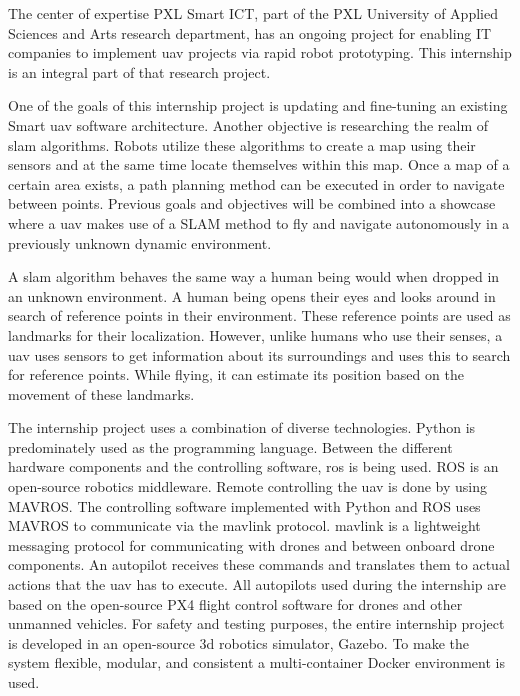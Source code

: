 The center of expertise PXL Smart ICT, part of the PXL University of Applied Sciences and Arts research department, has an ongoing project for enabling IT companies to implement \ac{uav} projects via rapid robot prototyping. This internship is an integral part of that research project.

One of the goals of this internship project is updating and fine\hyp{}tuning an existing Smart \acs{uav} software architecture. Another objective is researching the realm of \ac{slam} algorithms. Robots utilize these algorithms to create a map using their sensors and at the same time locate themselves within this map. Once a map of a certain area exists, a path planning method can be executed in order to navigate between points. Previous goals and objectives will be combined into a showcase where a \acs{uav} makes use of a SLAM method to fly and navigate autonomously in a previously unknown dynamic environment.

A \acs{slam} algorithm behaves the same way a human being would when dropped in an unknown environment. A human being opens their eyes and looks around in search of reference points in their environment. These reference points are used as landmarks for their localization. However, unlike humans who use their senses, a \acs{uav} uses sensors to get information about its surroundings and uses this to search for reference points. While flying, it can estimate its position based on the movement of these landmarks.

The internship project uses a combination of diverse technologies. Python is predominately used as the programming language. Between the different hardware components and the controlling software, \acs{ros} is being used. ROS is an open\hyp{}source robotics middleware. Remote controlling the \acs{uav} is done by using MAVROS. The controlling software implemented with Python and ROS uses MAVROS to communicate via the \acs{mavlink} protocol. \acs{mavlink} is a lightweight messaging protocol for communicating with drones and between onboard drone components. An autopilot receives these commands and translates them to actual actions that the \acs{uav} has to execute. All autopilots used during the internship are based on the open\hyp{}source PX4 flight control software for drones and other unmanned vehicles. For safety and testing purposes, the entire internship project is developed in an open\hyp{}source \acs{3d} robotics simulator, Gazebo. To make the system flexible, modular, and consistent a multi\hyp{}container Docker environment is used.